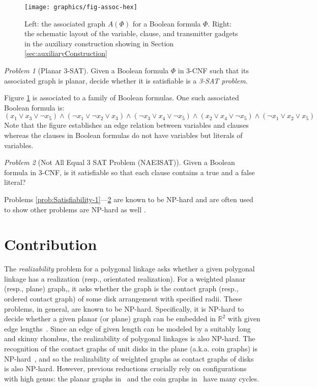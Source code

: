 \documentclass[10pt]{CSUNthesis}
\theoremstyle{plain}%
\theoremstyle{definition}
\theoremstyle{remark}
\newtheorem{prob}{Problem}
\newcommand{\RR}{\mathbb{R}} %
\begin{document}
  \begin{figure}[htbp]
	\centering
	\texttt{[image: graphics/fig-assoc-hex]}
	\caption{Left: the associated graph $A(\Phi)$ for a Boolean formula $\Phi$.
Right: the schematic layout of the variable, clause, and transmitter gadgets in the auxiliary construction showing in Section \ref{sec:auxiliaryConstruction}}
	\label{fig:assoc}
\end{figure} 
\begin{prob}[Planar 3-SAT]
 Given a Boolean formula $\Phi$ in 3-CNF such that its associated graph is planar, decide whether it 
is satisfiable is a \textit{3-SAT problem}.
\end{prob}
Figure \ref{fig:assoc} is associated to a family of Boolean formulas.  
One such associated Boolean formula is:
$$(x_1 \lor x_3 \lor \lnot x_5) \land (\lnot x_1 \lor \lnot x_2 \lor x_3) \land (\lnot x_3 \lor x_4 \lor \lnot x_5) \land (x_2 \lor x_4 \lor \lnot x_5) \land ( \lnot x_1 \lor x_2 \lor x_5)$$
Note that the figure establishes an edge relation between variables and clauses whereas the clauses in Boolean formulas do not have variables but literals of variables.
\begin{prob}[Not All Equal 3 SAT Problem (NAE3SAT)]\label{prob:Satisfiability-2}%
Given a Boolean formula in 3-CNF, is it satisfiable so that each clause contains a 
true and a false literal?
\end{prob}

Problems \ref{prob:Satisfiability-1}---\ref{prob:Satisfiability-2} are known to be NP-hard and are often used to show other problems are NP-hard as well \cite{lichtenstein1982planar,karp1972reducibility}.



\section{Contribution}
The \emph{realizability} problem for a polygonal linkage asks whether a given polygonal linkage has 
a realization (resp., orientated realization). For a weighted planar (resp., plane) graph,, it asks 
whether the graph is
the contact graph (resp., ordered contact graph) of some disk arrangement with specified radii. 
These problems, in general, are known to be NP-hard. Specifically, it is NP-hard to decide whether a 
given planar (or plane) graph can be embedded in $\RR^2$ with given edge lengths~\cite{CDD+10,EW90}. 
Since an edge of given length can be modeled by a suitably long and skinny rhombus, the 
realizability of polygonal linkages is also NP-hard. The recognition of the contact graphs of unit 
disks in the plane (a.k.a. coin graphs) is NP-hard~\cite{BK98}, and so the realizability of weighted 
graphs as contact graphs of disks is also NP-hard. However, previous reductions crucially rely on 
configurations with high genus: the planar graphs in~\cite{CDD+10,EW90} and the coin graphs 
in~\cite{BK98} have many cycles.
\end{document}
